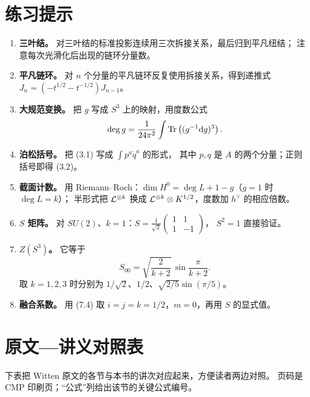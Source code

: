 \section{练习提示}

\begin{enumerate}[leftmargin=*]
  \item \textbf{三叶结。} 对三叶结的标准投影连续用三次拆接关系，最后归到平凡纽结；
        注意每次光滑化后出现的链环分量数。
  \item \textbf{平凡链环。} 对 $n$ 个分量的平凡链环反复使用拆接关系，得到递推式
        $J_n=(-t^{1/2}-t^{-1/2})J_{n-1}$。
  \item \textbf{大规范变换。} 把 $g$ 写成 $S^3$ 上的映射，用度数公式
        \[
        \deg g=\frac{1}{24\pi^2}\int\operatorname{Tr}\left((g^{-1}\mathrm{d} g)^3\right).
        \]
  \item \textbf{泊松括号。} 把 (3.1) 写成 $\int p^a\dot q^a$ 的形式，
        其中 $p,q$ 是 $A$ 的两个分量；正则括号即得 (3.2)。
  \item \textbf{截面计数。} 用 Riemann--Roch：$\dim H^0=\deg L+1-g$（$g=1$ 时 $\deg L=k$）；
        半形式把 $\mathcal{L}^{\otimes k}$ 换成 $\mathcal{L}^{\otimes k}\otimes K^{1/2}$，度数加 $h^\vee$ 的相应倍数。
  \item \textbf{$S$ 矩阵。} 对 $SU(2)$、$k=1$：$S=\frac{1}{\sqrt2}\begin{pmatrix}1&1\\1&-1\end{pmatrix}$，
        $S^2=1$ 直接验证。
  \item \textbf{$Z(S^3)$。} 它等于
        \[
        S_{00}=\sqrt{\frac{2}{k+2}}\,\sin\frac{\pi}{k+2}.
        \]
        取 $k=1,2,3$ 时分别为 $1/\sqrt2$、$1/2$、$\sqrt{2/5}\sin(\pi/5)$。
  \item \textbf{融合系数。} 用 (7.4) 取 $i=j=k=1/2$，$m=0$，再用 $S$ 的显式值。
\end{enumerate}

\section{原文—讲义对照表}

下表把 Witten 原文的各节与本书的讲次对应起来，方便读者两边对照。
页码是 CMP 印刷页；“公式”列给出该节的关键公式编号。

